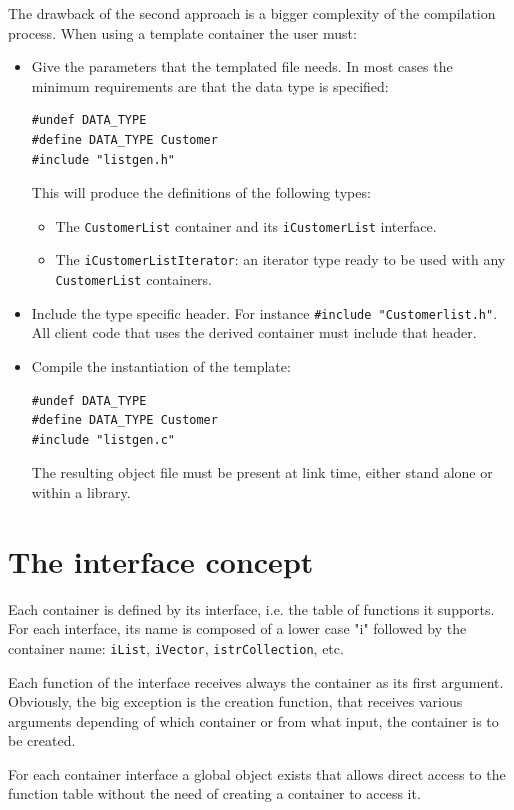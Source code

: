 \documentclass[12pt,a4paper]{memoir} %
\begin{document}
The drawback of the second approach is a bigger complexity of the compilation process. When using a template container the user must:
\begin{itemize}
\item Give the parameters that the templated file needs. In most cases the minimum requirements are that the data type is specified:
\begin{verbatim}
#undef DATA_TYPE
#define DATA_TYPE Customer
#include "listgen.h"
\end{verbatim}

This will produce the definitions of the following types:
\begin{itemize}
\item The \verb,CustomerList, container and its \verb,iCustomerList, interface.
\item The \verb,iCustomerListIterator,: an iterator type ready to be used with any \verb,CustomerList, containers.
\end{itemize}
\item Include the type specific header. For instance \verb,#include "Customerlist.h",. All client code that uses the derived container must
include that header.
\item Compile the instantiation of the template:
\begin{verbatim}
#undef DATA_TYPE
#define DATA_TYPE Customer
#include "listgen.c"
\end{verbatim}

The resulting object file must be present at link time, either stand alone or within a library.
\end{itemize}

\section{The interface concept}
Each container is defined by its interface, i.e. the table of functions it supports. For each interface, its name is composed of a lower case "i" followed by the container name: \verb,iList,, \verb,iVector,, \verb,istrCollection,, etc.

Each function of the interface receives always the container as its first argument. Obviously, the big exception is the creation function, that receives various arguments depending of which container or from what input, the container is to be created.

For each container interface a global object exists that allows direct access to the function table without the need of creating a container to access it.
\end{document}
